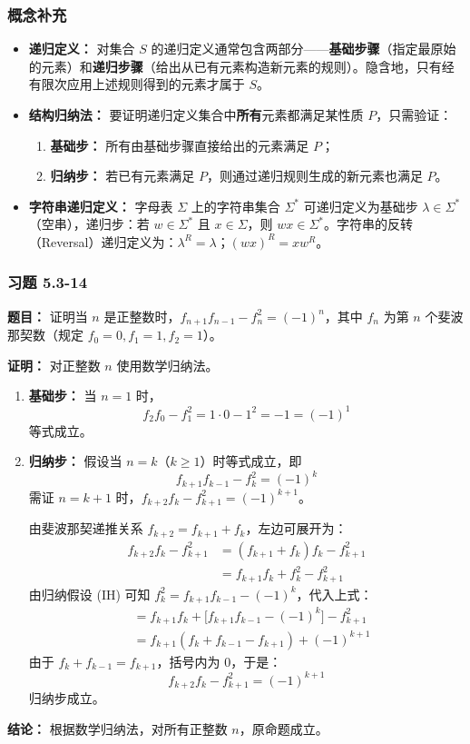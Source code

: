 \documentclass[11pt,UTF8]{article}
\begin{document}
\subsubsection*{概念补充}
\begin{itemize}
    \item \textbf{递归定义：} 对集合 $S$ 的递归定义通常包含两部分——\textbf{基础步骤}（指定最原始的元素）和\textbf{递归步骤}（给出从已有元素构造新元素的规则）。隐含地，只有经有限次应用上述规则得到的元素才属于 $S$。
    \item \textbf{结构归纳法：} 要证明递归定义集合中\textbf{所有}元素都满足某性质 $P$，只需验证：
    \begin{enumerate}[1.]
        \item \textbf{基础步：} 所有由基础步骤直接给出的元素满足 $P$；
        \item \textbf{归纳步：} 若已有元素满足 $P$，则通过递归规则生成的新元素也满足 $P$。
    \end{enumerate}
    \item \textbf{字符串递归定义：} 字母表 $\Sigma$ 上的字符串集合 $\Sigma^*$ 可递归定义为基础步 $\lambda \in \Sigma^*$（空串），递归步：若 $w \in \Sigma^*$ 且 $x \in \Sigma$，则 $wx \in \Sigma^*$。字符串的反转（Reversal）递归定义为：$\lambda^R = \lambda$；$(wx)^R = x w^R$。
\end{itemize}

\subsubsection*{习题 5.3-14}
\textbf{题目：} 证明当 $n$ 是正整数时，$f_{n+1}f_{n-1} - f_n^2 = (-1)^n$，其中 $f_n$ 为第 $n$ 个斐波那契数（规定 $f_0=0, f_1=1, f_2=1$）。

\textbf{证明：} 对正整数 $n$ 使用数学归纳法。

\begin{enumerate}[1.]
    \item \textbf{基础步：} 当 $n=1$ 时，
    \[ f_2 f_0 - f_1^2 = 1 \cdot 0 - 1^2 = -1 = (-1)^1 \]
    等式成立。

    \item \textbf{归纳步：} 假设当 $n=k$（$k \ge 1$）时等式成立，即
    \[ f_{k+1}f_{k-1} - f_k^2 = (-1)^k \tag{IH} \]
    需证 $n=k+1$ 时，$f_{k+2}f_k - f_{k+1}^2 = (-1)^{k+1}$。

    由斐波那契递推关系 $f_{k+2} = f_{k+1} + f_k$，左边可展开为：
    \begin{align*}
        f_{k+2}f_k - f_{k+1}^2
        &= (f_{k+1} + f_k)f_k - f_{k+1}^2 \\
        &= f_{k+1}f_k + f_k^2 - f_{k+1}^2
    \end{align*}
    由归纳假设 (IH) 可知 $f_k^2 = f_{k+1}f_{k-1} - (-1)^k$，代入上式：
    \begin{align*}
        &= f_{k+1}f_k + \bigl[f_{k+1}f_{k-1} - (-1)^k\bigr] - f_{k+1}^2 \\
        &= f_{k+1}(f_k + f_{k-1} - f_{k+1}) + (-1)^{k+1}
    \end{align*}
    由于 $f_k + f_{k-1} = f_{k+1}$，括号内为 $0$，于是：
    \[ f_{k+2}f_k - f_{k+1}^2 = (-1)^{k+1} \]
    归纳步成立。
\end{enumerate}
\textbf{结论：} 根据数学归纳法，对所有正整数 $n$，原命题成立。
\end{document}
